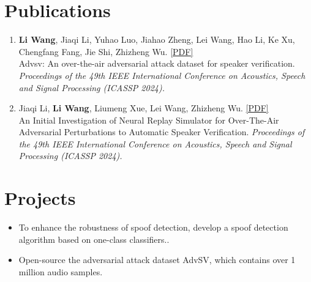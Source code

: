 \documentclass{resume}
\begin{document}





\section{Publications}
\begin{enumerate}\itemsep 0.5em
  \item \textbf{Li Wang}, Jiaqi Li, Yuhao Luo, Jiahao Zheng, Lei Wang, Hao Li, Ke Xu, Chengfang Fang, Jie Shi, Zhizheng Wu. \href{https://ieeexplore.ieee.org/abstract/document/10446549}{[PDF]} \\Advsv: An over-the-air adversarial attack dataset for speaker verification. \textit{Proceedings of the 49th IEEE International Conference on Acoustics, Speech and Signal Processing (ICASSP 2024).}
  \item Jiaqi Li, \textbf{Li Wang}, Liumeng Xue, Lei Wang, Zhizheng Wu. \href{https://www.isca-speech.org/archive/interspeech_2021/wang21da_interspeech.html}{[PDF]} \\ An Initial Investigation of Neural Replay Simulator for Over-The-Air Adversarial Perturbations to Automatic Speaker Verification. \textit{Proceedings of the 49th IEEE International Conference on Acoustics, Speech and Signal Processing (ICASSP 2024).}

\end{enumerate}




\section{Projects}
\begin{itemize}
  \item To enhance the robustness of spoof detection, develop a spoof detection algorithm based on one-class classifiers..
  \item Open-source the adversarial attack dataset AdvSV, which contains over 1 million audio samples.
\end{itemize}
\end{document}
